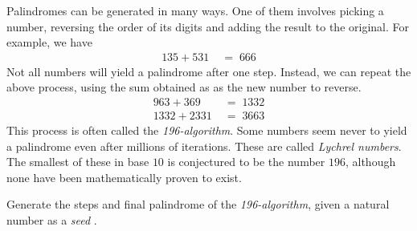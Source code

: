 

\problem Palindromes can be generated in many ways. One of them involves picking a number, reversing
the order of its digits and adding the result to the original. For example, we have
\begin{align*}
	135 + 531 \; &= \; 666
\end{align*}
Not all numbers will yield a palindrome after one step. Instead, we can repeat the above process, using the sum obtained as
as the new number to reverse.
\begin{align*}
	963 + 369   \; &= \; 1332 \\
	1332 + 2331 \; &= \; 3663
\end{align*}
This process is often called the \textit{196-algorithm}. 
Some numbers seem never to yield a palindrome even after millions of iterations. These are called \textit{Lychrel numbers}.
The smallest of these in base $10$ is conjectured to be the number $196$, although none have been mathematically proven to exist.

Generate the steps and final palindrome of the \textit{196-algorithm}, given a natural number as a \textit{seed \footnotemark}.

